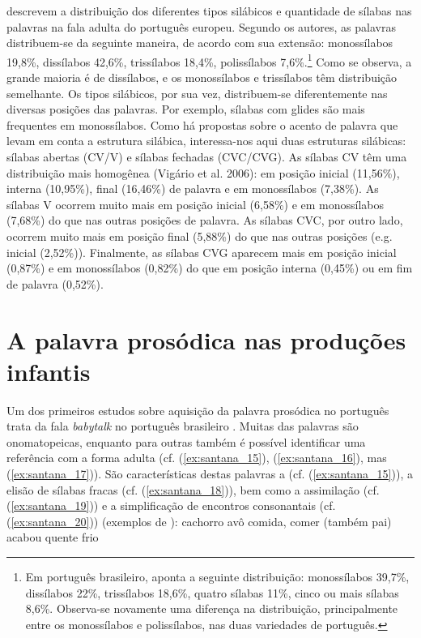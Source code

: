\documentclass[output=paper]{LSP/langsci}
\begin{document}
\citet{vigario_etal2006} descrevem a distribuição dos diferentes tipos silábicos e quantidade de sílabas nas palavras na fala adulta do português europeu. Segundo os autores, as palavras distribuem-se da seguinte maneira, de acordo com sua extensão: monossílabos 19,8\%, dissílabos 42,6\%, trissílabos 18,4\%, polissílabos 7,6\%.\footnote{Em português brasileiro, \citet{cintra1997} aponta a seguinte distribuição: monossílabos 39,7\%, dissílabos 22\%, trissílabos 18,6\%, quatro sílabas 11\%, cinco ou mais sílabas 8,6\%. Observa-se novamente uma diferença na distribuição, principalmente entre os monossílabos e polissílabos, nas duas variedades de português.} Como se observa, a grande maioria é de dissílabos, e os monossílabos e trissílabos têm distribuição semelhante. Os tipos silábicos, por sua vez, distribuem-se diferentemente nas diversas posições das palavras. Por exemplo, sílabas com glides são mais frequentes em monossílabos. Como há propostas sobre o acento de palavra que levam em conta a estrutura silábica, interessa-nos aqui duas estruturas silábicas: sílabas abertas (CV/V) e sílabas fechadas (CVC/CVG). As sílabas CV têm uma distribuição mais homogênea (Vigário et al. 2006): em posição inicial (11,56\%), interna (10,95\%), final (16,46\%) de palavra e em monossílabos (7,38\%). As sílabas V ocorrem muito mais em posição inicial (6,58\%) e em monossílabos (7,68\%) do que nas outras posições de palavra. As sílabas CVC, por outro lado, ocorrem muito mais em posição final (5,88\%) do que nas outras posições (e.g. inicial (2,52\%)). Finalmente, as sílabas CVG aparecem mais em posição inicial (0,87\%) e em monossílabos (0,82\%) do que em posição interna (0,45\%) ou em fim de palavra (0,52\%).

\section{A palavra prosódica nas produções infantis}
\label{sec:santana_palavra_prosodica_infantis}

Um dos primeiros estudos sobre aquisição da palavra prosódica no português trata da fala \textit{babytalk} no português brasileiro \citep{stoelgammon1976}. Muitas das palavras são onomatopeicas, enquanto para outras também é possível identificar uma referência com a forma adulta (cf. (\ref{ex:santana_15}), (\ref{ex:santana_16}), mas (\ref{ex:santana_17})). São características destas palavras a  (cf. (\ref{ex:santana_15})), a elisão de sílabas fracas (cf. (\ref{ex:santana_18})), bem como a assimilação (cf. (\ref{ex:santana_19})) e a simplificação de encontros consonantais (cf. (\ref{ex:santana_20})) (exemplos de \citealt{stoelgammon1976}):
\ea\label{ex:santana_15}\ipa{[uaw.aw]} cachorro\z
\ea\label{ex:santana_16}\ipa{[vo\pstr vo]} avô\z
\ea\label{ex:santana_17}\ipa{[pa\pstr pa]} comida, comer (também pai)\z
\ea\label{ex:santana_18}\ipa{[a.\pstr bo]} acabou\z
\ea\label{ex:santana_19}\ipa{[\pstr t\~{e}.te]} quente\z
\ea\label{ex:santana_20}\ipa{[fiw]} frio\z
\end{document}
